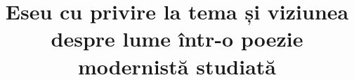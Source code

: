 

\title{Eseu cu privire la tema și viziunea despre lume într-o poezie modernistă studiată}


 \maketitle %
 

